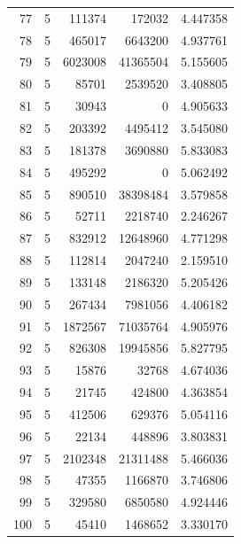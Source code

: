 \begin{longtable}{rrrrr}
77 & 5 & 111374 & 172032 & 4.447358\\
78 & 5 & 465017 & 6643200 & 4.937761\\
79 & 5 & 6023008 & 41365504 & 5.155605\\
80 & 5 & 85701 & 2539520 & 3.408805\\
81 & 5 & 30943 & 0 & 4.905633\\
82 & 5 & 203392 & 4495412 & 3.545080\\
83 & 5 & 181378 & 3690880 & 5.833083\\
84 & 5 & 495292 & 0 & 5.062492\\
85 & 5 & 890510 & 38398484 & 3.579858\\
86 & 5 & 52711 & 2218740 & 2.246267\\
87 & 5 & 832912 & 12648960 & 4.771298\\
88 & 5 & 112814 & 2047240 & 2.159510\\
89 & 5 & 133148 & 2186320 & 5.205426\\
90 & 5 & 267434 & 7981056 & 4.406182\\
91 & 5 & 1872567 & 71035764 & 4.905976\\
92 & 5 & 826308 & 19945856 & 5.827795\\
93 & 5 & 15876 & 32768 & 4.674036\\
94 & 5 & 21745 & 424800 & 4.363854\\
95 & 5 & 412506 & 629376 & 5.054116\\
96 & 5 & 22134 & 448896 & 3.803831\\
97 & 5 & 2102348 & 21311488 & 5.466036\\
98 & 5 & 47355 & 1166870 & 3.746806\\
99 & 5 & 329580 & 6850580 & 4.924446\\
100 & 5 & 45410 & 1468652 & 3.330170\\
\bottomrule\end{longtable}\endgroup
